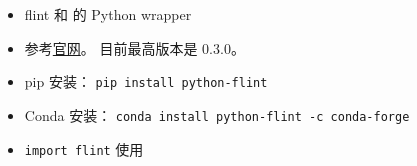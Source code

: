 
\begin{issues}
\issueDraft
\end{issues}

\begin{itemize}
\item flint 和  的 Python wrapper
\item 参考\href{https://fredrikj.net/python-flint/}{官网}。 目前最高版本是 0.3.0。
\item pip 安装： \verb`pip install python-flint`
\item Conda 安装： \verb`conda install python-flint -c conda-forge`
\item \verb`import flint` 使用
\end{itemize}
